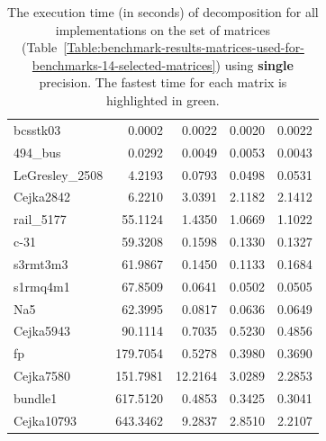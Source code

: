 \begin{table}[h!]
	\centering
	\begin{tabular}{|>{\footnotesize}l|>{\raggedleft\arraybackslash\footnotesize}r|>{\raggedleft\arraybackslash\footnotesize}r|>{\raggedleft\arraybackslash\footnotesize}r|>{\raggedleft\arraybackslash\footnotesize}r|}
		\hline
		\multicolumn{1}{|>{\centering\footnotesize}c|}{Matrix} & \multicolumn{1}{>{\centering\footnotesize}c|}{CM} & \multicolumn{1}{>{\centering\footnotesize}c|}{ICM8} & \multicolumn{1}{>{\centering\footnotesize}c|}{ICM16} & \multicolumn{1}{>{\centering\footnotesize}c|}{ICM32} \\ \hline
		bcsstk03        & \cellcolor{green!25}0.0002 &  0.0022 &                     0.0020 &                     0.0022 \\
		494\_bus 		&                     0.0292 &  0.0049 &                     0.0053 & \cellcolor{green!25}0.0043 \\
		LeGresley\_2508 &                     4.2193 &  0.0793 & \cellcolor{green!25}0.0498 &                     0.0531 \\
		Cejka2842		&                     6.2210 &  3.0391 & \cellcolor{green!25}2.1182 &                     2.1412 \\
		rail\_5177      &                    55.1124 &  1.4350 & \cellcolor{green!25}1.0669 &                     1.1022 \\
		c-31		    &                    59.3208 &  0.1598 &                     0.1330 & \cellcolor{green!25}0.1327 \\
		s3rmt3m3        &                    61.9867 &  0.1450 & \cellcolor{green!25}0.1133 &                     0.1684 \\
		s1rmq4m1        &                    67.8509 &  0.0641 & \cellcolor{green!25}0.0502 &                     0.0505 \\
		Na5             &                    62.3995 &  0.0817 & \cellcolor{green!25}0.0636 &                     0.0649 \\
		Cejka5943		&                    90.1114 &  0.7035 &                     0.5230 & \cellcolor{green!25}0.4856 \\
		fp              &                   179.7054 &  0.5278 &                     0.3980 & \cellcolor{green!25}0.3690 \\
		Cejka7580		&                   151.7981 & 12.2164 &                     3.0289 & \cellcolor{green!25}2.2853 \\
		bundle1         &                   617.5120 &  0.4853 &                     0.3425 & \cellcolor{green!25}0.3041 \\
		Cejka10793      &                   643.3462 &  9.2837 &                     2.8510 & \cellcolor{green!25}2.2107 \\ \hline
	\end{tabular}
	\caption{The execution time (in seconds) of decomposition for all implementations on the set of matrices (Table~\ref{Table:benchmark-results-matrices-used-for-benchmarks-14-selected-matrices}) using \textbf{single} precision. The fastest time for each matrix is highlighted in green.}
	\label{Table:benchmark-results-speedup-comparison-between-CM-and-different-ICMs-execution-times-single-precision}
\end{table}

